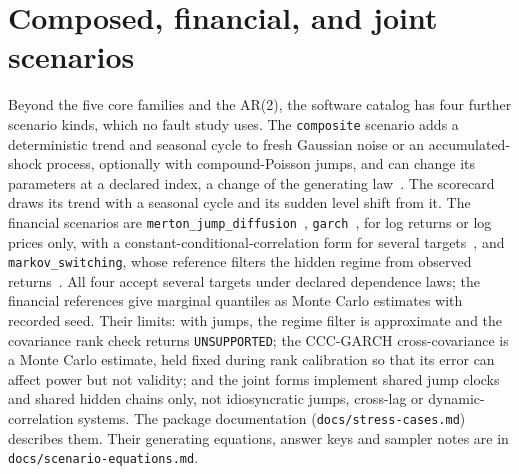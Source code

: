 \documentclass[11pt,a4paper]{article}
\newcommand{\code}[1]{\texttt{#1}}
\begin{document}



\appendix

\section{Composed, financial, and joint scenarios}
\label{app:extended}

Beyond the five core families and the AR(2), the software catalog has
four further scenario kinds, which no fault study uses. The
\code{composite} scenario adds a deterministic trend and seasonal cycle to
fresh Gaussian noise or an accumulated-shock process, optionally with
compound-Poisson jumps, and can change its parameters at a declared index,
a change of the generating law~\cite{gama2014drift}. The scorecard draws its trend
with a seasonal cycle and its sudden level shift from it. The financial
scenarios are \code{merton\_jump\_diffusion}~\cite{merton1976jumps},
\code{garch}~\cite{engle1982autoregressive,bollerslev1986garch}, for log
returns or log prices only, with a constant-conditional-correlation form
for several targets~\cite{bollerslev1990ccc}, and \code{markov\_switching}, whose
reference filters the hidden regime from observed
returns~\cite{hamilton1989regimes}. All four accept several targets under
declared dependence laws; the financial references give marginal
quantiles as Monte Carlo estimates with recorded seed. Their limits: with jumps,
the regime filter is approximate and the covariance rank check returns
\code{UNSUPPORTED}; the CCC-GARCH cross-covariance is a Monte Carlo
estimate, held fixed during rank calibration so that its error can affect
power but not validity; and the joint forms implement shared jump clocks
and shared hidden chains only, not idiosyncratic jumps, cross-lag or
dynamic-correlation systems. The package documentation
(\code{docs/stress-cases.md}) describes them. Their generating equations,
answer keys and sampler notes are in \code{docs/scenario-equations.md}.
\end{document}
